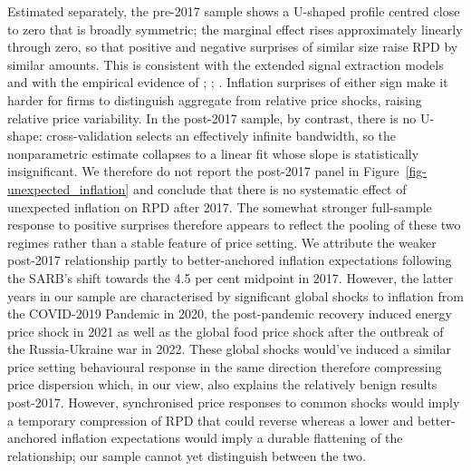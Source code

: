 \documentclass[
  letterpaper,
  DIV=11,
  numbers=noendperiod]{scrartcl}
\begin{document}
Estimated separately, the pre-2017 sample shows a U-shaped profile
centred close to zero that is broadly symmetric; the marginal effect
rises approximately linearly through zero, so that positive and negative
surprises of similar size raise RPD by similar amounts. This is
consistent with the extended signal extraction models
\citep{hercowitz1981, cukierman1983} and with the empirical evidence of
\citet{caraballo2013}; \citet{becker2012}; \citet{sara-zaror2024}.
Inflation surprises of either sign make it harder for firms to
distinguish aggregate from relative price shocks, raising relative price
variability. In the post-2017 sample, by contrast, there is no U-shape:
cross-validation selects an effectively infinite bandwidth, so the
nonparametric estimate collapses to a linear fit whose slope is
statistically insignificant. We therefore do not report the post-2017
panel in Figure~\ref{fig-unexpected_inflation} and conclude that there
is no systematic effect of unexpected inflation on RPD after 2017. The
somewhat stronger full-sample response to positive surprises therefore
appears to reflect the pooling of these two regimes rather than a stable
feature of price setting. We attribute the weaker post-2017 relationship
partly to better-anchored inflation expectations \citep{durand2023}
following the SARB's shift towards the 4.5 per cent midpoint in 2017.
However, the latter years in our sample are characterised by significant
global shocks to inflation from the COVID-2019 Pandemic in 2020, the
post-pandemic recovery induced energy price shock in 2021 as well as the
global food price shock after the outbreak of the Russia-Ukraine war in
2022. These global shocks would've induced a similar price setting
behavioural response in the same direction therefore compressing price
dispersion \citep{nakamura2018} which, in our view, also explains the
relatively benign results post-2017. However, synchronised price
responses to common shocks would imply a temporary compression of RPD
that could reverse whereas a lower and better-anchored inflation
expectations would imply a durable flattening of the relationship; our
sample cannot yet distinguish between the two.
\end{document}
